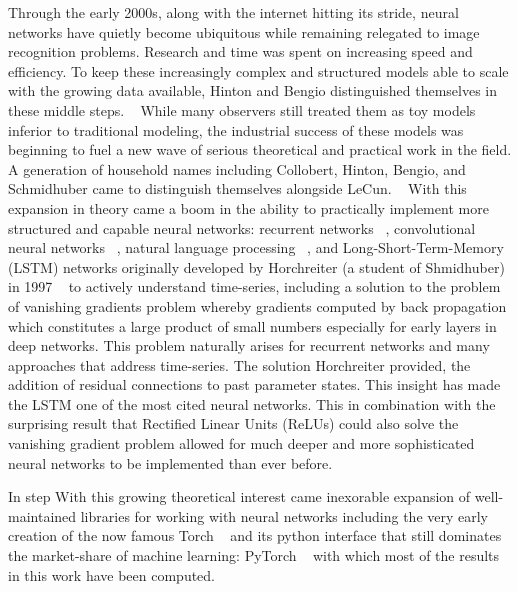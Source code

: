 Through the early 2000s, along with the internet hitting its stride,
neural networks have quietly become ubiquitous while  remaining
relegated to image recognition problems. Research and time was spent on increasing
speed and efficiency. To keep these increasingly complex and structured models able
to scale with the growing data available, Hinton and Bengio
distinguished themselves in these middle steps. 
~\citep{bengio2007greedy, hinton2006reducing, hinton2006fast}
While many observers still treated
them as toy models inferior to traditional modeling,  the
industrial success of these models was beginning to fuel a new wave of
serious theoretical and practical work in the field. A generation of
household names including Collobert, Hinton, Bengio, and Schmidhuber
came to distinguish themselves alongside LeCun. 
~\citep{coates2011analysis,
vincent2010stacked,
boureau2010learning,
hinton2010practical,
glorot2010understanding,
erhan2010does,
bengio2009learning}
With this expansion in theory came a boom in the ability to
practically implement more structured and capable neural networks: recurrent networks ~\citep{mikolov2010recurrent},
convolutional neural networks ~\citep{lee2009convolutional}, natural
language processing ~\citep{collobert2011natural}, and
Long-Short-Term-Memory (LSTM) networks originally developed by
Horchreiter (a student of Shmidhuber) in
1997 ~\citep{hochreiter1997long} to actively understand time-series,
including a solution to the problem of vanishing
gradients problem whereby gradients computed by back propagation which
constitutes a large product of small numbers especially for early
layers in deep networks. This problem naturally arises for recurrent
networks and many approaches that address time-series. The solution
Horchreiter provided, the addition of residual connections to past
parameter states. This insight has made the LSTM one of the most cited
neural networks. This in combination with the surprising result that
Rectified Linear Units (ReLUs) could also solve the vanishing gradient
problem allowed for much deeper and more sophisticated neural networks
to be implemented than ever before. 

In step With this growing theoretical interest came inexorable expansion of
well-maintained libraries for working with neural networks including
the very early creation of the now famous Torch
~\citep{Collobert2002TorchAM} and its python interface that still
dominates the market-share of machine learning: PyTorch
~\citep{pytorch2019} with which most of the results in this
work have been computed. 

